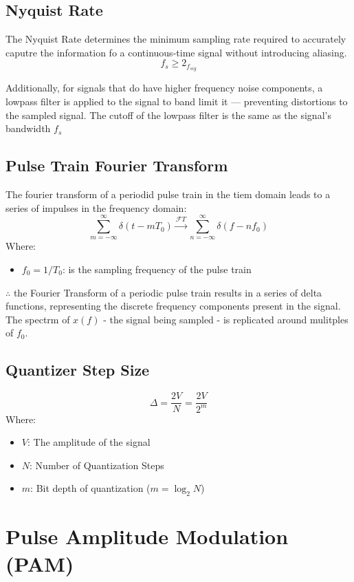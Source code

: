 \documentclass[10pt]{article}
\begin{document}
\subsection{Nyquist Rate}
The Nyquist Rate determines the minimum sampling rate required to accurately caputre the information fo a continuous-time signal without introducing aliasing.
\[
    f_s \ge 2_f_{sig}
\]

Additionally, for signals that do have higher frequency noise components, a lowpass filter is applied to the signal to band limit it --- preventing distortions to the sampled signal. The cutoff of the lowpass filter is the same as the signal's bandwidth $f_s$

\subsection{Pulse Train Fourier Transform}
The fourier transform of a periodid pulse train in the tiem domain leads to a series of impulses in the frequency domain:
\[
    \sum_{m=-\infty}^{\infty} \delta(t - m T_0) \xrightarrow{\mathcal{F}T} \sum_{n=-\infty}^{\infty} \delta(f - n f_0)
\]
\noindent Where:
\begin{itemize}
    \item $f_0=1/T_0$: is the sampling frequency of the pulse train
\end{itemize}

\noindent $\therefore$ the Fourier Transform of a periodic pulse train results in a series of delta functions, representing the discrete frequency components present in the signal. The spectrm of $x(f)$ - the signal being sampled - is replicated around mulitples of $f_0$.

\subsection{Quantizer Step Size}
\[
    \Delta = \frac{2V}{N} = \frac{2V}{2^m}
\]
\noindent Where:
\begin{itemize}
    \item $V$: The amplitude of the signal
    \item $N$: Number of Quantization Steps
    \item $m$: Bit depth of quantization ($m=\log_2{N}$)
\end{itemize}

\section{Pulse Amplitude Modulation (PAM)}
\end{document}
